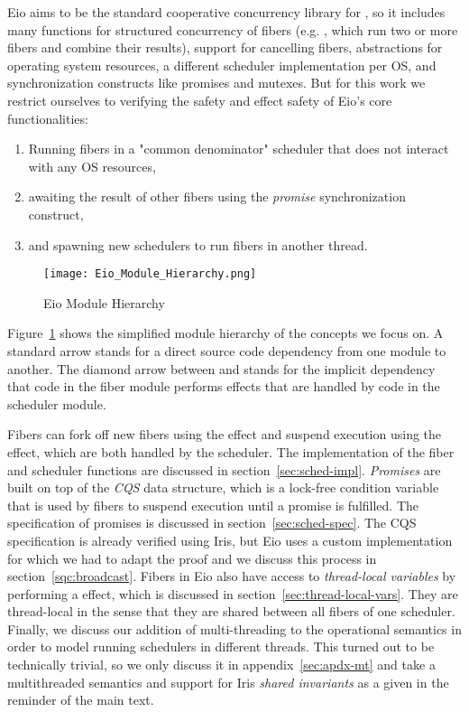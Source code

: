 Eio aims to be the standard cooperative concurrency library for \ocf{}, so it includes many functions for structured concurrency of fibers (e.g. , which run two or more fibers and combine their results), support for cancelling fibers, abstractions for operating system resources, a different scheduler implementation per OS, and synchronization constructs like promises and mutexes.
But for this work we restrict ourselves to verifying the safety and effect safety of Eio's core functionalities:
\begin{enumerate}
  \item Running fibers in a "common denominator" scheduler that does not interact with any OS resources,
  \item awaiting the result of other fibers using the \emph{promise} synchronization construct,
  \item and spawning new schedulers to run fibers in another thread.
\end{enumerate}

\begin{figure}[ht]
  \centering
  \texttt{[image: Eio\_Module\_Hierarchy.png]}
  \caption{Eio Module Hierarchy}
  \label{fig:eio-module-hierarchy}
\end{figure}

Figure~\ref{fig:eio-module-hierarchy} shows the simplified module hierarchy of the concepts we focus on.
A standard arrow stands for a direct source code dependency from one module to another.
The diamond arrow between  and  stands for the implicit dependency that code in the fiber module performs effects that are handled by code in the scheduler module.

Fibers can fork off new fibers using the \efork{} effect and suspend execution using the \esuspend{} effect, which are both handled by the scheduler.
The implementation of the fiber and scheduler functions are discussed in section~\ref{sec:sched-impl}.
\emph{Promises} are built on top of the \emph{CQS} data structure, which is a lock-free condition variable that is used by fibers to suspend execution until a promise is fulfilled.
The specification of promises is discussed in section~\ref{sec:sched-spec}.
The CQS specification is already verified using Iris, but Eio uses a custom implementation for which we had to adapt the proof and we discuss this process in section~\ref{sqc:broadcast}.
Fibers in Eio also have access to \emph{thread-local variables} by performing a \egetctx{} effect, which is discussed in section~\ref{sec:thread-local-vars}.
They are thread-local in the sense that they are shared between all fibers of one scheduler.
Finally, we discuss our addition of multi-threading to the \hazel{} operational semantics in order to model running schedulers in different threads.
This turned out to be technically trivial, so we only discuss it in appendix~\ref{sec:apdx-mt} and take a multithreaded semantics and support for Iris \emph{shared invariants} as a given in the reminder of the main text.

